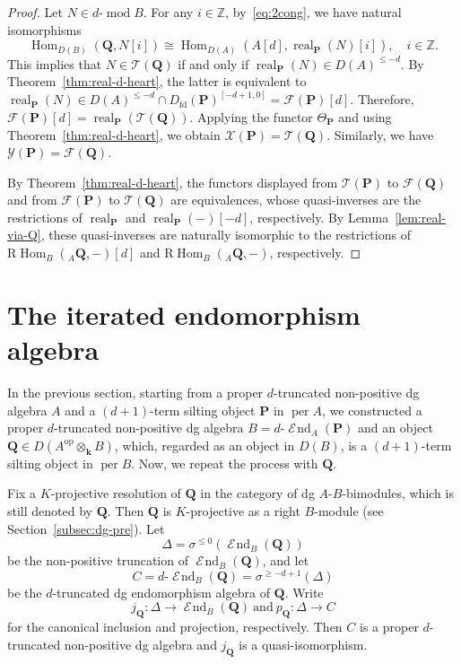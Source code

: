 \documentclass[11pt,a4paper,reqno]{amsart}
\theoremstyle{plain}
\numberwithin{equation}{section}
\theoremstyle{definition}
\providecommand{\per}{\operatorname{per}}
\renewcommand{\mod}{\operatorname{mod}}
\newcommand{\Hom}{\operatorname{Hom}}
\newcommand{\RHom}{\mathrm R\!\Hom}
\newcommand{\real}{\operatorname{real}}
\renewcommand{\k}{\mathbf{k}}
\DeclareMathOperator{\huaEnd}{\mathcal{E}\!nd}
\newcommand{\emod}[2]{#1\text{-}\!\mod #2}
\newcommand{\eheart}[2]{#2^{[-#1+1,0]}}
\newcommand{\eend}[2]{#1\text{-}\huaEnd_{#2}}
\newcommand{\PP}{\mathbf{P}}
\newcommand{\QQ}{\mathbf{Q}}
\newcommand{\T}{\mathcal{T}}
\newcommand{\F}{\mathcal{F}}
\newcommand{\X}{\mathcal{X}}
\newcommand{\Y}{\mathcal{Y}}
\begin{document}
\begin{proof}
  Let $N\in\emod{d}{B}$. For any $i\in\mathbb Z$, by~\eqref{eq:2cong}, we have natural isomorphisms
  \[
  \Hom_{D(B)}(\QQ,N[i])
 \cong\Hom_{D(A)}(A[d],\real_{\PP}(N)[i]),\quad i\in\mathbb Z.
  \]
  This implies that $N\in\T(\QQ)$ if and only if $\real_{\PP}(N)\in D(A)^{\leq-d}$. By Theorem~\ref{thm:real-d-heart}, the latter is equivalent to $\real_{\PP}(N)\in D(A)^{\leq-d}\cap \eheart{d}{D_{\mathrm{fd}}(\PP)}=\F(\PP)[d]$. Therefore, $\F(\PP)[d] = \real_{\PP}(\T(\QQ))$. Applying the functor $\Theta_{\PP}$ and using Theorem~\ref{thm:real-d-heart}, we obtain $\X(\PP)=\T(\QQ)$. Similarly, we have $\Y(\PP)=\F(\QQ)$.

  By Theorem~\ref{thm:real-d-heart}, the functors displayed from $\T(\PP)$ to $\F(\QQ)$ and from $\F(\PP)$ to $\T(\QQ)$ are equivalences, whose quasi-inverses are the restrictions of $\real_{\PP}$ and $\real_{\PP}(-)[-d]$, respectively. By Lemma~\ref{lem:real-via-Q}, these quasi-inverses are naturally isomorphic to the restrictions of $\RHom_B({}_A\QQ,-)[d]$ and $\RHom_B({}_A\QQ,-)$, respectively.
\end{proof}

\section{The iterated endomorphism algebra}\label{sec:algC}

In the previous section, starting from a proper $d$-truncated non-positive dg algebra $A$ and a $(d+1)$-term silting object $\PP$ in $\per A$, we constructed a proper $d$-truncated non-positive dg algebra $B=\eend{d}{A}(\PP)$ and an object $\QQ\in D(A^{\mathrm{op}}\otimes_\k B)$, which, regarded as an object in $D(B)$, is a $(d+1)$-term silting object in $\per B$. Now, we repeat the process with $\QQ$.

Fix a $K$-projective resolution of $\QQ$ in the category of dg $A$-$B$-bimodules, which is still denoted by $\QQ$. Then $\QQ$ is $K$-projective as a right $B$-module (see Section~\ref{subsec:dg-pre}). Let 
\[\Delta=\sigma^{\leq0}(\huaEnd_B(\QQ))\]
be the non-positive truncation of $\huaEnd_B(\QQ)$, and let 
\[C=\eend{d}{B}(\QQ)=\sigma^{\geq -d+1}(\Delta)\]
be the $d$-truncated dg endomorphism algebra of $\QQ$. Write
\[
 j_{\QQ}\colon\Delta\rightarrow\huaEnd_B(\QQ)
 \ \text{and}\ 
 p_{\QQ}\colon\Delta\rightarrow C
\]
for the canonical inclusion and projection, respectively. Then $C$ is a proper $d$-truncated non-positive dg algebra and $j_{\QQ}$ is a quasi-isomorphism.
\end{document}
